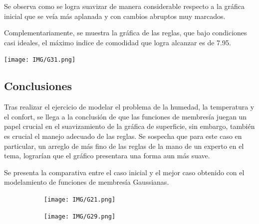 \documentclass[11pt, letterpaper]{article}
\begin{document}
Se observa como se logra suavizar de manera considerable respecto a la gráfica inicial que se veía más aplanada y con cambios abruptos muy marcados.

\newpage

Complementariamente, se muestra la gráfica de las reglas, que bajo condiciones casi ideales, el máximo indice de comodidad que logra alcanzar es de 7.95.

\texttt{[image: IMG/G31.png]}

\subsection{Conclusiones}

Tras realizar el ejercicio de modelar el problema de la humedad, la temperatura y el confort, se llega a la conclusión de que las funciones de membresía juegan un papel crucial en el suavizamiento de la gráfica de superficie, sin embargo, también es crucial el manejo adecuado de las reglas. Se sospecha que para este caso en particular, un arreglo de más fino de las reglas de la mano de un experto en el tema, lograrían que el gráfico presentara una forma aun más suave.

Se presenta la comparativa entre el caso inicial y el mejor caso obtenido con el modelamiento de funciones de membresía Gaussianas.

\begin{figure}[h]
	\centering
	\begin{subfigure}{0.42\textwidth} %
		\centering
		\texttt{[image: IMG/G21.png]}
		\label{fig:G211}
	\end{subfigure}
	\hfill
	\begin{subfigure}{0.42\textwidth} %
		\centering
		\texttt{[image: IMG/G29.png]}
		\label{fig:G212}
	\end{subfigure}
	\label{fig:comparacion4}
\end{figure}



\newpage
\end{document}
